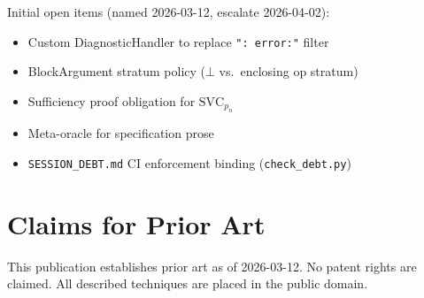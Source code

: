 \documentclass[11pt,letterpaper]{article}
\theoremstyle{pirtmthm}
\theoremstyle{remark}
\begin{document}
\noindent Initial open items (named 2026-03-12, escalate 2026-04-02):
\begin{itemize}[leftmargin=1.8em,itemsep=2pt]
  \item Custom DiagnosticHandler to replace \texttt{": error:"} filter
  \item BlockArgument stratum policy ($\bot$ vs.\ enclosing op stratum)
  \item Sufficiency proof obligation for $\mathrm{SVC}_{p_n}$
  \item Meta-oracle for specification prose
  \item \texttt{SESSION\_DEBT.md} CI enforcement binding (\texttt{check\_debt.py})
\end{itemize}

\section{Claims for Prior Art}

This publication establishes prior art as of 2026-03-12.
No patent rights are claimed.
All described techniques are placed in the public domain.
\end{document}
